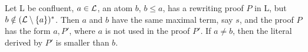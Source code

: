  \begin{lemma} \label {le:first-rule} 
Let \C L be confluent, \(a\in \mbox {$\cal L$}\), an atom $b$, \(b\leq a\), has a
rewriting proof $P$ in \C L, but \(b\notin(\mbox {$\cal L$}\setminus \{a\})^\ast\).  Then
$a$ and $b$ have the same maximal term, say $s$, and the proof $P$ has the
form $a,P'$, where $a$ is not used in the proof $P'$. If \(a\ne b\), then the
literal derived by $P'$ is smaller than $b$.
 \end{lemma}
%
%
%
%

